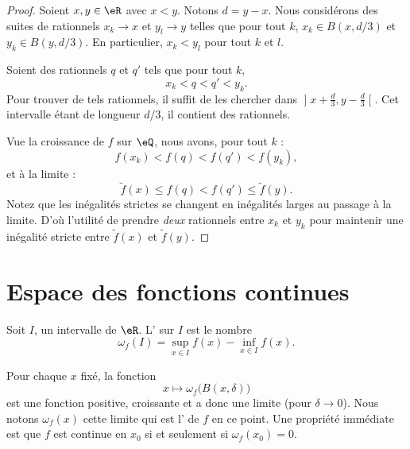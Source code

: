 \begin{proof}
	Soient \( x,y\in \eR\) avec \( x<y\). Notons \( d=y-x\). Nous considérons des suites de rationnels \( x_k\to x\) et \( y_l\to y\) telles que pour tout \( k\), \( x_k\in B(x,d/3)\) et \( y_k\in B(y,d/3)\). En particulier, \( x_k<y_l\) pour tout \( k\) et \( l\).

	Soient des rationnels \( q\) et \( q'\) tels que pour tout \( k\),
	\begin{equation}
		x_k<q<q'<y_k.
	\end{equation}
	Pour trouver de tels rationnels, il suffit de les chercher dans \( \mathopen] x+\frac{ d }{ 3 } , y-\frac{ d }{ 3 } \mathclose[\). Cet intervalle étant de longueur \( d/3\), il contient des rationnels.

	Vue la croissance de \( f\) sur \( \eQ\), nous avons, pour tout \( k\) :
	\begin{equation}
		f(x_k)<f(q)<f(q')<f(y_k),
	\end{equation}
	et à la limite :
	\begin{equation}
		\tilde f(x)\leq f(q)<f(q')\leq \tilde f(y).
	\end{equation}
	Notez que les inégalités strictes se changent en inégalités larges au passage à la limite. D'où l'utilité de prendre \emph{deux} rationnels entre \( x_k\) et \( y_k\) pour maintenir une inégalité stricte entre \(\tilde f(x)\) et \( \tilde f(y)\).
\end{proof}

\section{Espace des fonctions continues}

\begin{definition}
	Soit \( I\), un intervalle de \( \eR\). L' sur \( I\) est le nombre
	\begin{equation}
		\omega_f(I)=\sup_{x\in I}f(x)-\inf_{x\in I}f(x).
	\end{equation}
\end{definition}
Pour chaque \( x\) fixé, la fonction
\begin{equation}
	x\mapsto \omega_f\big( B(x,\delta) \big)
\end{equation}
est une fonction positive, croissante et a donc une limite (pour \( \delta\to 0\)). Nous notons \( \omega_f(x)\) cette limite qui est l' de \( f\) en ce point. Une propriété immédiate est que \( f\) est continue en \( x_0\) si et seulement si \( \omega_f(x_0)=0\).

